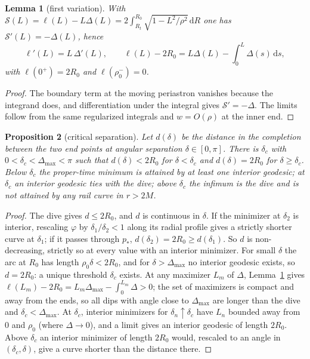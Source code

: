 \documentclass[aip,jmp,amsmath,amssymb,reprint]{revtex4-2}
\newcommand{\dd}{\mathrm{d}}
\theoremstyle{plain}
\newtheorem{proposition}{Proposition}[section]
\newtheorem{lemma}[proposition]{Lemma}
\theoremstyle{definition}
\begin{document}
\begin{lemma}[first variation]\label{lem:first-variation}
With $\mathcal S(L)=\ell(L)-L\Delta(L)=2\int_{R_t}^{R_0}\sqrt{1-L^2/\rho^2}\,\dd R$ one has
$\mathcal S'(L)=-\Delta(L)$, hence
\[
  \ell'(L)=L\,\Delta'(L),\qquad \ell(L)-2R_0=L\Delta(L)-\int_0^L\Delta(s)\,\dd s,
\]
with $\ell(0^+)=2R_0$ and $\ell(\rho_0^-)=0$.
\end{lemma}

\begin{proof}
The boundary term at the moving periastron vanishes because the integrand does, and
differentiation under the integral gives $\mathcal S'=-\Delta$. The limits follow from the same
regularized integrals and $w=O(\rho)$ at the inner end.
\end{proof}

\begin{proposition}[critical separation]\label{prop:critical}
Let $d(\delta)$ be the distance in the completion between the two end points at angular
separation $\delta\in[0,\pi]$. There is $\delta_c$ with $0<\delta_c<\Delta_{\max}<\pi$ such that
$d(\delta)<2R_0$ for $\delta<\delta_c$ and $d(\delta)=2R_0$ for $\delta\ge\delta_c$. Below $\delta_c$ the
proper-time minimum is attained by at least one interior geodesic; at $\delta_c$ an interior
geodesic ties with the dive; above $\delta_c$ the infimum is the dive and is not attained by any
rail curve in $r>2M$.
\end{proposition}

\begin{proof}
The dive gives $d\le2R_0$, and $d$ is continuous in $\delta$. If the minimizer at $\delta_2$ is
interior, rescaling $\varphi$ by $\delta_1/\delta_2<1$ along its radial profile gives a strictly
shorter curve at $\delta_1$; if it passes through $p_*$, $d(\delta_2)=2R_0\ge d(\delta_1)$. So $d$ is
non-decreasing, strictly so at every value with an interior minimizer. For small $\delta$ the arc
at $R_0$ has length $\rho_0\delta<2R_0$, and for $\delta>\Delta_{\max}$ no interior geodesic exists, so
$d=2R_0$: a unique threshold $\delta_c$ exists. At any maximizer $L_m$ of $\Delta$,
Lemma~\ref{lem:first-variation} gives $\ell(L_m)-2R_0=L_m\Delta_{\max}-\int_0^{L_m}\Delta>0$; the set
of maximizers is compact and away from the ends, so all dips with angle close to $\Delta_{\max}$
are longer than the dive and $\delta_c<\Delta_{\max}$. At $\delta_c$, interior minimizers for
$\delta_n\uparrow\delta_c$ have $L_n$ bounded away from $0$ and $\rho_0$ (where $\Delta\to0$), and a limit
gives an interior geodesic of length $2R_0$. Above $\delta_c$ an interior minimizer of length
$2R_0$ would, rescaled to an angle in $(\delta_c,\delta)$, give a curve shorter than the distance
there.
\end{proof}
\end{document}
